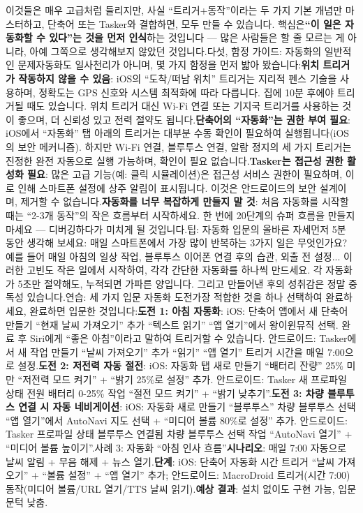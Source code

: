 이것들은 매우 고급처럼 들리지만, 사실 “트리거+동작”이라는 두 가지 기본 개념만 마스터하고, 단축어 또는 Tasker와 결합하면, 모두 만들 수 있습니다. 핵심은\textbf{“이 일은 자동화할 수 있다”는 것을 먼저 인식}하는 것입니다 — 많은 사람들은 할 줄 모르는 게 아니라, 아예 그쪽으로 생각해보지 않았던 것입니다.다섯, 함정 가이드: 자동화의 일반적인 문제자동화도 일사천리가 아니며, 몇 가지 함정을 먼저 밟아 봤습니다:\textbf{위치 트리거가 작동하지 않을 수 있음}: iOS의 “도착/떠남 위치” 트리거는 지리적 펜스 기술을 사용하며, 정확도는 GPS 신호와 시스템 최적화에 따라 다릅니다. 집에 10분 후에야 트리거될 때도 있습니다. 위치 트리거 대신 Wi-Fi 연결 또는 기지국 트리거를 사용하는 것이 좋으며, 더 신뢰성 있고 전력 절약도 됩니다.\textbf{단축어의 “자동화”는 권한 부여 필요}: iOS에서 “자동화” 탭 아래의 트리거는 대부분 수동 확인이 필요하여 실행됩니다(iOS의 보안 메커니즘). 하지만 Wi-Fi 연결, 블루투스 연결, 알람 정지의 세 가지 트리거는 진정한 완전 자동으로 실행 가능하며, 확인이 필요 없습니다.\textbf{Tasker는 접근성 권한 활성화 필요}: 많은 고급 기능(예: 클릭 시뮬레이션)은 접근성 서비스 권한이 필요하며, 이로 인해 스마트폰 설정에 상주 알림이 표시됩니다. 이것은 안드로이드의 보안 설계이며, 제거할 수 없습니다.\textbf{자동화를 너무 복잡하게 만들지 말 것}: 처음 자동화를 시작할 때는 “2-3개 동작”의 작은 흐름부터 시작하세요. 한 번에 20단계의 슈퍼 흐름을 만들지 마세요 — 디버깅하다가 미치게 될 것입니다.팁: 자동화 입문의 올바른 자세먼저 5분 동안 생각해 보세요: 매일 스마트폰에서 가장 많이 반복하는 3가지 일은 무엇인가요? 예를 들어 매일 아침의 일상 작업, 블루투스 이어폰 연결 후의 습관, 외출 전 설정... 이러한 고빈도 작은 일에서 시작하여, 각각 간단한 자동화를 하나씩 만드세요. 각 자동화가 5초만 절약해도, 누적되면 가파른 양입니다. 그리고 만들어낸 후의 성취감은 정말 중독성 있습니다.연습: 세 가지 입문 자동화 도전가장 적합한 것을 하나 선택하여 완료하세요, 완료하면 입문한 것입니다:\textbf{도전 1: 아침 자동화}: iOS: 단축어 앱에서 새 단축어 만들기 “현재 날씨 가져오기” 추가 “텍스트 읽기” “앱 열기”에서 왕이윈뮤직 선택. 완료 후 Siri에게 “좋은 아침”이라고 말하여 트리거할 수 있습니다. 안드로이드: Tasker에서 새 작업 만들기 “날씨 가져오기” 추가 “읽기” “앱 열기” 트리거 시간을 매일 7:00으로 설정.\textbf{도전 2: 저전력 자동 절전}: iOS: 자동화 탭 새로 만들기 “배터리 잔량” 25\% 미만 “저전력 모드 켜기” + “밝기 25\%로 설정” 추가. 안드로이드: Tasker 새 프로파일 상태 전원 배터리 0-25\% 작업 “절전 모드 켜기” + “밝기 낮추기”.\textbf{도전 3: 차량 블루투스 연결 시 자동 네비게이션}: iOS: 자동화 새로 만들기 “블루투스” 차량 블루투스 선택 “앱 열기”에서 AutoNavi 지도 선택 + “미디어 볼륨 80\%로 설정” 추가. 안드로이드: Tasker 프로파일 상태 블루투스 연결됨 차량 블루투스 선택 작업 “AutoNavi 열기” + “미디어 볼륨 높이기”.사례 3: 자동화 “아침 인사 흐름”\textbf{시나리오}: 매일 7:00 자동으로 날씨 알림 + 무음 해제 + 뉴스 열기.\textbf{단계}: iOS: 단축어 자동화 시간 트리거 “날씨 가져오기” + “볼륨 설정” + “앱 열기” 추가; 안드로이드: MacroDroid 트리거(시간 7:00) 동작(미디어 볼륨/URL 열기/TTS 날씨 읽기).\textbf{예상 결과}: 설치 없이도 구현 가능, 입문 문턱 낮춤.
